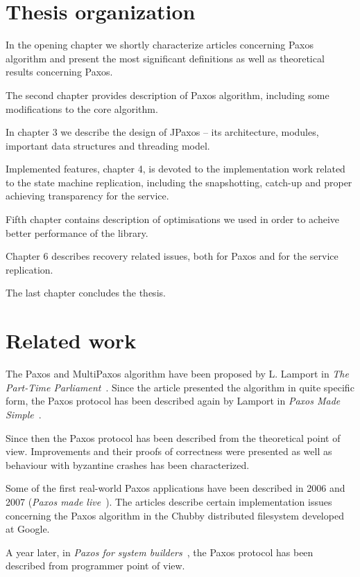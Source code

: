 \section{Thesis organization}


In the opening chapter we shortly characterize articles concerning Paxos algorithm and present the most significant definitions as well as theoretical results concerning Paxos.

The second chapter provides description of Paxos algorithm, including some modifications to the core algorithm.

In chapter 3 we describe the design of JPaxos -- its architecture, modules, important data structures and threading model.

Implemented features, chapter 4, is devoted to the implementation work related to the state machine replication, including the snapshotting, catch-up and proper achieving transparency for the service.

Fifth chapter contains description of optimisations we used in order to acheive better performance of the library.

Chapter 6 describes recovery related issues, both for Paxos and for the service replication.

The last chapter concludes the thesis.


\section{Related work}

The Paxos and MultiPaxos algorithm have been proposed by L. Lamport in \textit{The Part-Time Parliament}~\cite{Lam98}. Since the article presented the algorithm in quite specific form, the Paxos protocol has been described again by Lamport in \textit{Paxos Made Simple}~\cite{Lam01}.

Since then the Paxos protocol has been described from the theoretical point of view. Improvements and their proofs of correctness were presented as well as behaviour with byzantine crashes has been characterized.

Some of the first real-world Paxos applications have been described in 2006 and 2007 (\textit{Paxos made live}~\cite{CGR07}). The articles describe certain implementation issues concerning the Paxos algorithm in the Chubby distributed filesystem developed at Google.

A year later, in \textit{Paxos for system builders}~\cite{AK08}, the Paxos protocol has been described from programmer point of view.

